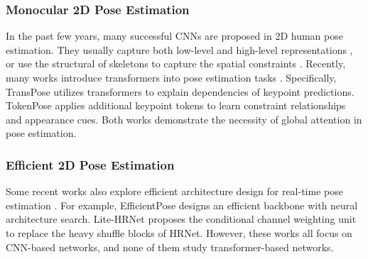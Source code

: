\documentclass[runningheads]{llncs}
\begin{document}
\subsubsection{Monocular 2D Pose Estimation} 
In the past few years, many successful CNNs are proposed in 2D human pose estimation. 
They usually capture both low-level and high-level representations \cite{wei2016convolutional,chen2018cascaded,newell2016stacked,chu2017multi,xiao2018simple,sun2019deep}, or use the structural of skeletons to capture the spatial constraints \cite{tompson2014joint,ke2018multi,papandreou2018personlab,kong2019adaptive,kong2020rotation,chen2020nonparametric,kong2020sia}.
Recently, many works introduce transformers into pose estimation tasks \cite{yang2020transpose,li2021tokenpose,mao2021tfpose,li2021pose,lin2020end,zheng20213d}. 
Specifically, TransPose \cite{yang2020transpose} utilizes transformers to explain dependencies of keypoint predictions. TokenPose \cite{li2021tokenpose} applies additional keypoint tokens to learn constraint relationships and appearance cues. Both works demonstrate the necessity of global attention in pose estimation. 
\vspace{-0.5em}
\subsubsection{Efficient 2D Pose Estimation} 
Some recent works also explore efficient architecture design for real-time pose estimation \cite{osokin2018real,neff2020efficienthrnet,shen2021towards,wang2022lite,zhang2021efficientpose,yu2021lite}. 
For example, EfficientPose \cite{zhang2021efficientpose} designs an efficient backbone with neural architecture search. 
Lite-HRNet \cite{yu2021lite} proposes the conditional channel weighting unit to replace the heavy shuffle blocks of HRNet. 
However, these works all focus on CNN-based networks, and none of them study transformer-based networks. 
\vspace{-0.5em}
\end{document}
